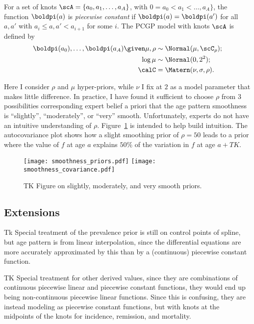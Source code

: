 For a set of knots $\scA = \{a_0, a_1, \ldots, a_A\}$, with $0 = a_0 < a_1 <
\ldots , a_A\}$, the function $\boldpi(a)$ is \emph{piecewise
  constant} if $\boldpi(a) = \boldpi(a')$ for all $a, a'$ with $a_i
\leq a, a' < a_{i+1}$ for some $i$.  The PCGP model with knots $\scA$
is defined by
\begin{align*}
\boldpi(a_0), \ldots, \boldpi(a_A) \given \mu, \rho &\sim \Normal(\mu, \scC_\rho);\\
\log \mu &\sim \Normal(0, 2^2);\\
\calC &= \Matern(\nu, \sigma, \rho).\\
\end{align*}

Here I consider $\rho$ and $\mu$ hyper-priors, while $\nu$ I fix at
$2$ as a model parameter that makes little difference.  In practice, I
have found it sufficient to choose $\rho$ from $3$ possibilities corresponding
expert belief a priori that the age pattern smoothness is ``slightly'',
``moderately'', or ``very'' smooth.
Unfortunately, experts do not have an intuitive understanding of
$\rho$. Figure~\ref{theory-age_pattern_model-smoothness_priors} is
intended to help build intuition. The autocovariance plot shows how a
slight smoothing prior of $\rho=50$ leads to a prior where the value
of $f$ at age $a$ explains $50\%$ of the variation in $f$ at age
$a+TK$.  

\begin{figure}[h]
\begin{center}
\texttt{[image: smoothness\_priors.pdf]}
\texttt{[image: smoothness\_covariance.pdf]}
\end{center}
\caption{TK Figure on slightly, moderately, and very smooth priors.}
\label{theory-age_pattern_model-smoothness_priors}
\end{figure}
\subsection{Extensions}
Tk Special treatment of the prevalence prior is still on control
points of spline, but age pattern is from linear interpolation, since
the differential equations are more accurately approximated by this
than by a (continuous) piecewise constant function.

TK Special treatment for other derived values, since they are
combinations of continuous piecewise linear and piecewise constant
functions, they would end up being non-continuous piecewise linear
functions.  Since this is confusing, they are instead modeling as
piecewise constant functions, but with knots at the midpoints of the
knots for incidence, remission, and mortality.

